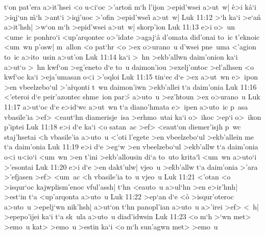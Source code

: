 t`on
pat'era
a>it'hsei
<o
u<i`oc
>'arton\r{}
m`h
l'ijon
>epid'wsei
a>ut~w|
\r{e}>i
k\r{a}`i
>iqj`un
\r{m}`h
>ant`i
>iqj'uoc
>'ofin
>epid'wsei\r{}
a>ut~w|\bibvsend
\vs Luk 11:12
>`h
ka`i
>e`an\r{}
a>it'hsh|
>w`on
m`h
>epid'wsei
a>ut~w|
skorp'ion\bibvsend
\vs Luk 11:13
e>i
o>~un
<ume~ic
ponhro`i
<up'arqontec
o>'idate
>agaj`a\r{}
d'omata
did'onai
to~ic
t'eknoic
<um~wn
p'osw|
m~allon
<o
pat`hr
<o
>ex
o>urano~u
d'wsei
pne~uma
<'agion
to~ic
a>ito~usin
a>ut'on\bibvsend
\vs Luk 11:14
ka`i
>~hn
>ekb'allwn
daim'onion
ka`i
a>ut`o
>~hn
kwf`on
>eg'eneto
d`e
to~u
daimon'iou
>exelj'ontoc
>el'alhsen
<o
kwf`oc
ka`i
>eja'umasan
o<i
>'oqloi\bibvsend
\vs Luk 11:15
tin`ec
d`e
>ex
a>ut~wn
e>~ipon
>en
vbeelzebo`ul
>'a\r{r}qonti
t~wn
daimon'iwn
>ekb'allei
t`a
daim'onia\bibvsend
\vs Luk 11:16
<'eteroi
d`e
peir'azontec
shme~ion
par>\r{}
a>uto~u
>ez'htoun
>ex
o>urano~u\bibvsend
\vs Luk 11:17
a>ut`oc
d`e
e>id`wc
a>ut~wn
t`a
diano'hmata
e>~ipen
a>uto~ic
p~asa
vbasile'ia
>ef>
<eaut`hn
diamerisje~isa
>erhmo~utai
ka`i
o>~ikoc
>ep`i
o>~ikon
p'iptei\bibvsend
\vs Luk 11:18
e>i
d`e
ka`i
<o
satan~ac
>ef>
<eaut`on
diemer'isjh
p~wc
staj'hsetai
<h
vbasile'ia
a>uto~u
<'oti
l'egete
>en
vbeelzebo`ul
>ekb'allein
me
t`a
daim'onia\bibvsend
\vs Luk 11:19
e>i
d`e
>eg`w
>en
vbeelzebo`ul
>ekb'allw
t`a
daim'onia
o<i
u<io`i
<um~wn
>en
t'ini
>ekb'allousin
di`a
to~uto
krita`i\r{}
<um~wn
a>uto`i
>'esontai\bibvsend
\vs Luk 11:20
e>i
d`e
>en
dakt'ulw|
vjeo~u
>e\r{k}b'allw
t`a
daim'onia
>'ara
>'efjasen
>ef>
<um~ac
<h
vbasile'ia
to~u
vjeo~u\bibvsend
\vs Luk 11:21
<'otan
<o
>isqur`oc
kajwplism'enoc
vful'assh|
t`hn
<eauto~u
a>ul`hn
>en
e>ir'hnh|
>est`in
t`a
<up'arqonta
a>uto~u\bibvsend
\vs Luk 11:22
>ep`an
d`e
<o\r{}
>isqur'oteroc
a>uto~u
>epelj`wn
nik'hsh|
a>ut`on
t`hn
panopl'ian
a>uto~u
a>'irei
>ef>
<~h|
>epepo'ijei
ka`i
t`a
sk~ula
a>uto~u
diad'idwsin\bibvsend
\vs Luk 11:23
<o
m`h
>`wn
met>
>emo~u
kat>
>emo~u
>estin
ka`i
<o
m`h
sun'agwn
met>
>emo~u
